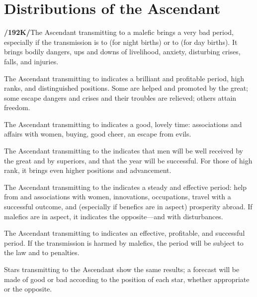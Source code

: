 \section{Distributions of the Ascendant}

\textbf{/192K/}The Ascendant transmitting to a malefic brings a very bad period, especially if the transmission is to \Saturn\xspace (for night births) or to \Mars\xspace (for day births). It brings bodily dangers, ups and downs of livelihood, anxiety, disturbing crises, falls, and injuries.

The Ascendant transmitting to \Jupiter\xspace indicates a brilliant and profitable period, high ranks, and distinguished positions. Some are helped and promoted by the great; some escape dangers and crises and their troubles are relieved; others attain freedom.

The Ascendant transmitting to \Venus\xspace indicates a good, lovely time: associations and affairs with women, buying, good cheer, an escape from evils.

The Ascendant transmitting to the \Sun\xspace indicates that men will be well received by the great and by superiors, and that the year will be successful. For those of high rank, it brings even higher positions and
advancement.

The Ascendant transmitting to the \Moon\xspace indicates a steady and effective period: help from and associations with women, innovations, occupations, travel with a successful outcome, and (especially if benefics are in aspect) prosperity abroad. If malefics are in aspect, it indicates the opposite—and with disturbances.

The Ascendant transmitting to \Mercury\xspace indicates an effective, profitable, and successful period. If the
transmission is harmed by malefics, the period will be subject to the law and to penalties.

Stars transmitting to the Ascendant show the same results; a forecast will be made of good or bad according to the position of each star, whether appropriate or the opposite.

\newpage